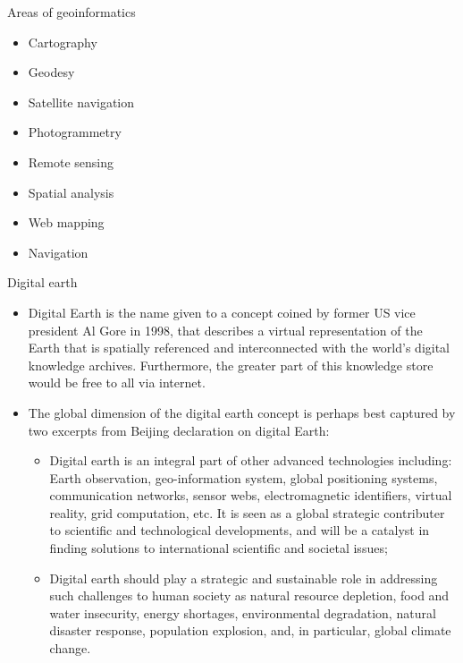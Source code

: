 \documentclass[11pt,dvipsnames,ignorenonframetext,aspectratio=169]{beamer}
\providecommand{\tightlist}{%
  \setlength{\itemsep}{0pt}\setlength{\parskip}{0pt}}
\begin{document}
\begin{frame}{Areas of geoinformatics}
\protect\hypertarget{areas-of-geoinformatics}{}
\begin{itemize}
\tightlist
\item
  Cartography
\item
  Geodesy
\item
  Satellite navigation
\item
  Photogrammetry
\item
  Remote sensing
\item
  Spatial analysis
\item
  Web mapping
\item
  Navigation
\end{itemize}
\end{frame}

\begin{frame}{Digital earth}
\protect\hypertarget{digital-earth}{}
\footnotesize

\begin{itemize}
\tightlist
\item
  Digital Earth is the name given to a concept coined by former US vice
  president Al Gore in 1998, that describes a virtual representation of
  the Earth that is spatially referenced and interconnected with the
  world's digital knowledge archives. Furthermore, the greater part of
  this knowledge store would be free to all via internet.
\item
  The global dimension of the digital earth concept is perhaps best
  captured by two excerpts from Beijing declaration on digital Earth:

  \begin{itemize}
  \scriptsize
  \item Digital earth is an integral part of other advanced technologies including: Earth observation, geo-information system, global positioning systems, communication networks, sensor webs, electromagnetic identifiers, virtual reality, grid computation, etc. It is seen as a global strategic contributer to scientific and technological developments, and will be a catalyst in finding solutions to international scientific and societal issues;
  \item Digital earth should play a strategic and sustainable role in addressing such challenges to human society as natural resource depletion, food and water insecurity, energy shortages, environmental degradation, natural disaster response, population explosion, and, in particular, global climate change.
  \end{itemize}
\end{itemize}
\end{frame}
\end{document}
